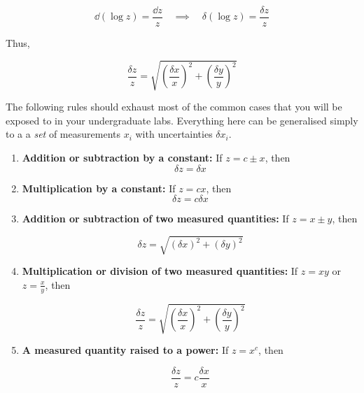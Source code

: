 \begin{equation*}
    \dd({\log{z}}) = \frac{\dd z}{z} \quad \implies \quad \delta (\log{z}) = \frac{\delta z}{z}
\end{equation*}

Thus, 

\begin{equation}
    \frac{\delta z}{z} = \sqrt{\left(\frac{\delta x}{x}\right)^2 + \left(\frac{\delta y}{y}\right)^2}
\end{equation}

\begin{tip}
The following rules should exhaust most of the common cases that you will be exposed to in your undergraduate labs. Everything here can be generalised simply to a a \textit{set} of measurements $x_i$ with uncertainties $\delta x_i$.

\begin{enumerate}
    \item \textbf{Addition or subtraction by a constant:} If $z = c \pm x$, then 
    \begin{equation}
        \delta z = \delta x
    \end{equation}
    
    
    \item \textbf{Multiplication by a constant:} If $z = c x$, then 
    \begin{equation}
        \delta z = c\delta x
    \end{equation}
    
    \item \textbf{Addition or subtraction of two measured quantities:} If $z = x \pm y$, then 
    
    \begin{equation}
        \delta z = \sqrt{(\delta x)^2 +(\delta y)^2}
    \end{equation}
    
    \item \textbf{Multiplication or division of two measured quantities:} If $z = xy$ or $z = \frac{x}{y}$, then 
    
    \begin{equation}
        \frac{\delta z}{z} = \sqrt{\left(\frac{\delta x}{x}\right)^2 + \left(\frac{\delta y}{y} \right)^2}
        \label{relerror}
    \end{equation}
    
    \item \textbf{A measured quantity raised to a power:} If $z = x^c$, then
    
    \begin{equation}
        \frac{\delta z}{z} = c \frac{\delta x}{x}
        \label{powerror}
    \end{equation}
    
\end{enumerate}
\end{tip}


